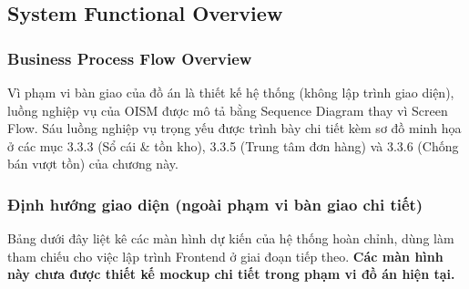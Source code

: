 \subsection{System Functional Overview}

\subsubsection{Business Process Flow Overview}

Vì phạm vi bàn giao của đồ án là thiết kế hệ thống (không lập trình giao diện), luồng nghiệp vụ của OISM được mô tả bằng Sequence Diagram thay vì Screen Flow. Sáu luồng nghiệp vụ trọng yếu được trình bày chi tiết kèm sơ đồ minh họa ở các mục 3.3.3 (Sổ cái \& tồn kho), 3.3.5 (Trung tâm đơn hàng) và 3.3.6 (Chống bán vượt tồn) của chương này.

\subsubsection{Định hướng giao diện (ngoài phạm vi bàn giao chi tiết)}

Bảng dưới đây liệt kê các màn hình dự kiến của hệ thống hoàn chỉnh, dùng làm tham chiếu cho việc lập trình Frontend ở giai đoạn tiếp theo. \textbf{Các màn hình này chưa được thiết kế mockup chi tiết trong phạm vi đồ án hiện tại.}

